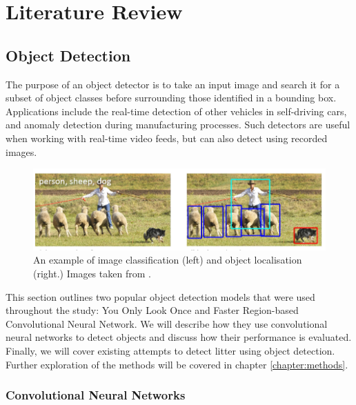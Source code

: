 \documentclass{thesis}
\begin{document}
\chapter{Literature Review}

\section{Object Detection}

The purpose of an object detector is to take an input image and search it for a subset of object classes before surrounding those identified in a bounding box. Applications include the real-time detection of other vehicles in self-driving cars, and anomaly detection during manufacturing processes. Such detectors are useful when working with real-time video feeds, but can also detect using recorded images. 

\begin{figure}[h]
    \centering
    \includegraphics[scale=1]{images/person-sheep-dog.PNG}
    \caption{An example of image classification (left) and object localisation (right.) Images taken from \cite{lin2015microsoft}.}
    \label{fig:cnn-diagram}
\end{figure}

This section outlines two popular object detection models that were used throughout the study: You Only Look Once and Faster Region-based Convolutional Neural Network. We will describe how they use convolutional neural networks to detect objects and discuss how their performance is evaluated. Finally, we will cover existing attempts to detect litter using object detection. Further exploration of the methods will be covered in chapter \ref{chapter:methods}.

\subsection{Convolutional Neural Networks}
\end{document}
